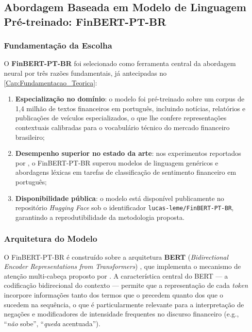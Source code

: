 \subsection{Abordagem Baseada em Modelo de Linguagem Pré-treinado: FinBERT-PT-BR}
\label{subsec:finbert}

\subsubsection{Fundamentação da Escolha}
\label{subsubsec:justificativa_finbert}

O \textbf{FinBERT-PT-BR} \cite{santos2023finbert} foi selecionado como ferramenta central da abordagem neural por três razões fundamentais, já antecipadas no \autoref{Cap:Fundamentacao_Teorica}:

\begin{enumerate}
	\item \textbf{Especialização no domínio}: o modelo foi pré-treinado sobre um corpus de 1,4 milhão de textos financeiros em português, incluindo notícias, relatórios e publicações de veículos especializados, o que lhe confere representações contextuais calibradas para o vocabulário técnico do mercado financeiro brasileiro;
	
	\item \textbf{Desempenho superior no estado da arte}: nos experimentos reportados por , o FinBERT-PT-BR superou modelos de linguagem genéricos e abordagens léxicas em tarefas de classificação de sentimento financeiro em português;
	
	\item \textbf{Disponibilidade pública}: o modelo está disponível publicamente no repositório \textit{Hugging Face} sob o identificador \texttt{lucas-leme/FinBERT-PT-BR}, garantindo a reprodutibilidade da metodologia proposta.
\end{enumerate}

\subsubsection{Arquitetura do Modelo}
\label{subsubsec:arquitetura_finbert}

O FinBERT-PT-BR é construído sobre a arquitetura \textbf{BERT} (\textit{Bidirectional Encoder Representations from Transformers}) \cite{devlin2019}, que implementa o mecanismo de atenção multi-cabeça proposto por . A característica central do BERT — a codificação bidirecional do contexto — permite que a representação de cada \textit{token} incorpore informações tanto dos termos que o precedem quanto dos que o sucedem na sequência, o que é particularmente relevante para a interpretação de negações e modificadores de intensidade frequentes no discurso financeiro (e.g., ``\textit{não} sobe'', ``\textit{queda} acentuada'').

